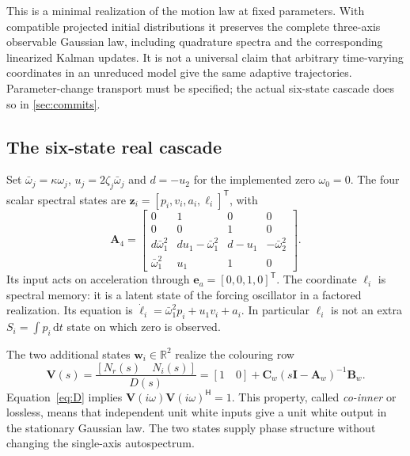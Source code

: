 \documentclass[conference]{IEEEtran}
\newcommand{\vc}[1]{\bm{#1}}
\newcommand{\mt}[1]{\bm{#1}}
\newcommand{\R}{\mathbb R}
\newcommand{\tr}{^{\mathsf T}}
\newcommand{\herm}{^{\mathsf H}}
\newcommand{\dd}{\mathrm d}
\begin{document}
This is a minimal realization of the motion law at fixed parameters. With
compatible projected initial distributions it preserves the complete
three-axis observable Gaussian law, including quadrature spectra and the
corresponding linearized Kalman updates. It is not a universal claim that
arbitrary time-varying coordinates in an unreduced model give the same
adaptive trajectories. Parameter-change transport must be specified; the
actual six-state cascade does so in \cref{sec:commits}.

\subsection{The six-state real cascade}
Set $\bar\omega_j=\kappa\omega_j$,
$u_j=2\zeta_j\bar\omega_j$ and $d=-u_2$ for the implemented zero
$\omega_0=0$. The four scalar spectral states are
$\vc z_i=[p_i,v_i,a_i,\ell_i]\tr$, with
\begin{equation}
 \mt A_4=\begin{bmatrix}
 0&1&0&0\\0&0&1&0\\
 d\bar\omega_1^2&du_1-\bar\omega_1^2&d-u_1&-\bar\omega_2^2\\
 \bar\omega_1^2&u_1&1&0
 \end{bmatrix}.
 \label{eq:A4}
\end{equation}
Its input acts on acceleration through $\vc e_a=[0,0,1,0]\tr$.
The coordinate $\ell_i$ is spectral memory: it is a latent state of the
forcing oscillator in a factored realization. Its equation is
$\dot\ell_i=\bar\omega_1^2p_i+u_1v_i+a_i$.
In particular $\ell_i$ is not an extra $S_i=\int p_i\,\dd t$ state on
which zero is observed.

The two additional states $\vc w_i\in\R^2$ realize the colouring row
\begin{equation}
 \mt V(s)=\frac{[N_r(s)\quad N_i(s)]}{D(s)}
       =[1\quad0]+\mt C_w(s\mt I-\mt A_w)^{-1}\mt B_w.
 \label{eq:V}
\end{equation}
Equation~\eqref{eq:D} implies
$\mt V(i\omega)\mt V(i\omega)\herm=1$. This property, called
\emph{co-inner} or lossless, means that independent unit white inputs give
a unit white output in the stationary Gaussian law. The two states supply
phase structure without changing the single-axis autospectrum.
\end{document}
